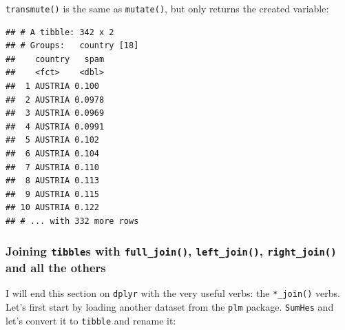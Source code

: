 \documentclass[]{gitbook}
\newenvironment{Shaded}{\begin{snugshade}}{\end{snugshade}}
\newcommand{\DataTypeTok}[1]{\textcolor[rgb]{0.13,0.29,0.53}{#1}}
\newcommand{\KeywordTok}[1]{\textcolor[rgb]{0.13,0.29,0.53}{\textbf{#1}}}
\newcommand{\NormalTok}[1]{#1}
\newcommand{\OperatorTok}[1]{\textcolor[rgb]{0.81,0.36,0.00}{\textbf{#1}}}
\newcommand{\StringTok}[1]{\textcolor[rgb]{0.31,0.60,0.02}{#1}}
\theoremstyle{definition}
\theoremstyle{definition}
\theoremstyle{definition}
\theoremstyle{remark}
\begin{document}
\texttt{transmute()} is the same as \texttt{mutate()}, but only returns
the created variable:

\begin{Shaded}
\end{Shaded}

\begin{verbatim}
## # A tibble: 342 x 2
## # Groups:   country [18]
##    country   spam
##    <fct>    <dbl>
##  1 AUSTRIA 0.100 
##  2 AUSTRIA 0.0978
##  3 AUSTRIA 0.0969
##  4 AUSTRIA 0.0991
##  5 AUSTRIA 0.102 
##  6 AUSTRIA 0.104 
##  7 AUSTRIA 0.110 
##  8 AUSTRIA 0.113 
##  9 AUSTRIA 0.115 
## 10 AUSTRIA 0.122 
## # ... with 332 more rows
\end{verbatim}

\hypertarget{joining-tibbles-with-full_join-left_join-right_join-and-all-the-others}{%
\subsubsection{\texorpdfstring{Joining \texttt{tibble}s with
\texttt{full\_join()}, \texttt{left\_join()}, \texttt{right\_join()} and
all the
others}{Joining tibbles with full\_join(), left\_join(), right\_join() and all the others}}\label{joining-tibbles-with-full_join-left_join-right_join-and-all-the-others}}

I will end this section on \texttt{dplyr} with the very useful verbs:
the \texttt{*\_join()} verbs. Let's first start by loading another
dataset from the \texttt{plm} package. \texttt{SumHes} and let's convert
it to \texttt{tibble} and rename it:

\begin{Shaded}
\end{Shaded}
\end{document}
